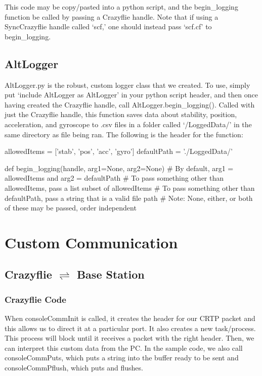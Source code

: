\documentclass[]{article}
\begin{document}
\noindent This code may be copy/pasted into a python script, and the begin\_logging function be called by passing a Crazyflie handle. Note that if using a SyncCrazyflie handle called `scf,' one should instead pass `scf.cf' to begin\_logging. \\

\subsection{AltLogger}

\noindent AltLogger.py is the robust, custom logger class that we created. To use, simply put `include AltLogger as AltLogger' in your python script header, and then once having created the Crazyflie handle, call AltLogger.begin\_logging(). Called with just the Crazyflie handle, this function saves data about stability, position, acceleration, and gyroscope to .csv files in a folder called `/LoggedData/' in the same directory as file being ran. The following is the header for the function:

\begin{Python}
allowedItems = ['stab', 'pos', 'acc', 'gyro']
defaultPath = './LoggedData/'
	
def begin_logging(handle, arg1=None, arg2=None)
# By default, arg1 = allowedItems and arg2 = defaultPath
# To pass something other than allowedItems, pass a list subset of allowedItems
# To pass something other than defaultPath, pass a string that is a valid file path
# Note: None, either, or both of these may be passed, order independent
\end{Python}

\section{Custom Communication}

\subsection{\texorpdfstring{Crazyflie $\rightleftharpoons$ Base Station}%
	{Between Crazyflie and Base Station}}

\subsubsection{Crazyflie Code}

\noindent When consoleCommInit is called, it creates the header for our CRTP packet and this allows us to direct it at a particular port. It also creates a new task/process. This process will block until it receives a packet with the right header. Then, we can interpret this custom data from the PC. In the sample code, we also call consoleCommPuts, which puts a string into the buffer ready to be sent and consoleCommPflush, which puts and flushes.
\end{document}
